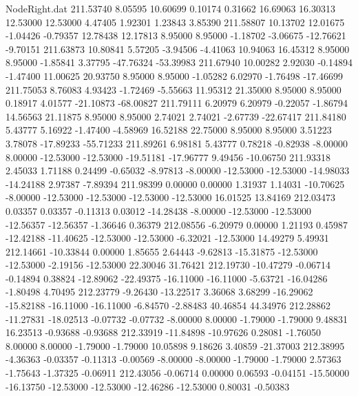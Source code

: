 \begin{filecontents}{NodeRight.dat}
 211.53740    8.05595   10.60699     0.10174    0.31662   16.69063   16.30313   12.53000   12.53000    4.47405    1.92301    1.23843    3.85390
 211.58807   10.13702   12.01675    -1.04426   -0.79357   12.78438   12.17813    8.95000    8.95000   -1.18702   -3.06675  -12.76621   -9.70151
 211.63873   10.80841    5.57205    -3.94506   -4.41063   10.94063   16.45312    8.95000    8.95000   -1.85841    3.37795  -47.76324  -53.39983
 211.67940   10.00282    2.92030    -0.14894   -1.47400   11.00625   20.93750    8.95000    8.95000   -1.05282    6.02970   -1.76498  -17.46699
 211.75053    8.76083    4.93423    -1.72469   -5.55663   11.95312   21.35000    8.95000    8.95000    0.18917    4.01577  -21.10873  -68.00827
 211.79111    6.20979    6.20979    -0.22057   -1.86794   14.56563   21.11875    8.95000    8.95000    2.74021    2.74021   -2.67739  -22.67417
 211.84180    5.43777    5.16922    -1.47400   -4.58969   16.52188   22.75000    8.95000    8.95000    3.51223    3.78078  -17.89233  -55.71233
 211.89261    6.98181    5.43777     0.78218   -0.82938   -8.00000    8.00000  -12.53000  -12.53000  -19.51181  -17.96777    9.49456  -10.06750
 211.93318    2.45033    1.71188     0.24499   -0.65032   -8.97813   -8.00000  -12.53000  -12.53000  -14.98033  -14.24188    2.97387   -7.89394
 211.98399    0.00000    0.00000     1.31937    1.14031  -10.70625   -8.00000  -12.53000  -12.53000  -12.53000  -12.53000   16.01525   13.84169
 212.03473    0.03357    0.03357    -0.11313    0.03012  -14.28438   -8.00000  -12.53000  -12.53000  -12.56357  -12.56357   -1.36646    0.36379
 212.08556   -6.20979    0.00000     1.21193    0.45987  -12.42188  -11.40625  -12.53000  -12.53000   -6.32021  -12.53000   14.49279    5.49931
 212.14661  -10.33844    0.00000     1.85655    2.64443   -9.62813  -15.31875  -12.53000  -12.53000   -2.19156  -12.53000   22.30046   31.76421
 212.19730  -10.47279   -0.06714    -0.14894    0.38824  -12.89062  -22.49375  -16.11000  -16.11000   -5.63721  -16.04286   -1.80498    4.70495
 212.23779   -9.26430  -13.22517     3.36068    3.68299  -16.29062  -15.82188  -16.11000  -16.11000   -6.84570   -2.88483   40.46854   44.34976
 212.28862  -11.27831  -18.02513    -0.07732   -0.07732   -8.00000    8.00000   -1.79000   -1.79000    9.48831   16.23513   -0.93688   -0.93688
 212.33919  -11.84898  -10.97626     0.28081   -1.76050    8.00000    8.00000   -1.79000   -1.79000   10.05898    9.18626    3.40859  -21.37003
 212.38995   -4.36363   -0.03357    -0.11313   -0.00569   -8.00000   -8.00000   -1.79000   -1.79000    2.57363   -1.75643   -1.37325   -0.06911
 212.43056   -0.06714    0.00000     0.06593   -0.04151  -15.50000  -16.13750  -12.53000  -12.53000  -12.46286  -12.53000    0.80031   -0.50383

\end{filecontents}

